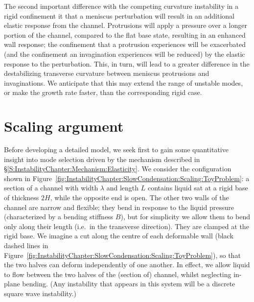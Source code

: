 The second important difference with the competing curvature instability in a rigid confinement it that a meniscus perturbation will result in an additional elastic response from the channel. Protrusions will apply a pressure over a longer portion of the channel, compared to the flat base state, resulting in an enhanced wall response; the confinement that a protrusion experiences will be exacerbated (and the confinement an invagination experiences will be reduced) by the elastic response to the perturbation. This, in turn, will lead to a greater difference in the destabilizing transverse curvature between meniscus protrusions and invaginations. We anticipate that this may extend the range of unstable modes, or make the growth rate faster, than the corresponding rigid case.


\section{Scaling argument}\label{S:InstabilityChapter:Scaling}

Before developing a detailed model, we seek first to gain some quantitative insight into mode selection driven by the mechanism described in \S\ref{S:InstabilityChapter:Mechanism:Elasticity}. We consider the configuration shown in Figure~\ref{fig:InstabilityChapter:SlowCondensation:Scaling:ToyProblem}: a section of a channel with width $\lambda$ and length $L$ contains liquid sat at a rigid base of thickness $2H$, while the opposite end is open. The other two walls of the channel are narrow and flexible; they bend in response to the liquid pressure (characterized by a bending stiffness $B$), but for simplicity we allow them to bend only along their length (i.e.~in the transverse direction). They are clamped at the rigid base. We imagine a cut along the centre of each deformable wall (black dashed lines in Figure~\ref{fig:InstabilityChapter:SlowCondensation:Scaling:ToyProblem}), so that the two halves can deform independently of one another. In effect, we allow liquid to flow between the two halves of the (section of) channel, whilst neglecting in-plane bending. (Any instability that appears in this system will be a discrete square wave instability.)

